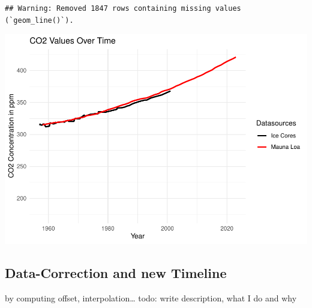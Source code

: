\documentclass[
]{article}
\begin{document}
\begin{verbatim}
## Warning: Removed 1847 rows containing missing values (`geom_line()`).
\end{verbatim}

\includegraphics{data_wrangling_files/figure-latex/unnamed-chunk-13-1.pdf}

\hypertarget{data-correction-and-new-timeline}{%
\subsection{Data-Correction and new
Timeline}\label{data-correction-and-new-timeline}}

by computing offset, interpolation\ldots{} todo: write description, what
I do and why
\end{document}
